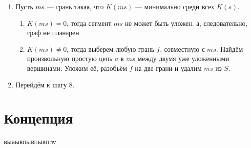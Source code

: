 \documentclass[a4paper, 10pt]{article}
\begin{document}
\begin{enumerate}
    \item Пусть $ms$ — грань такая, что $K(ms)$ — минимально среди всех $K(s)$.
          \begin{enumerate}
          \item $K(ms) = 0$, тогда сегмент $ms$ не может быть уложен, а, следовательно, граф не планарен.
          \item $K(ms) \ne 0$, тогда выберем любую грань $f$, совместную с $ms$. Найдём произвольную простую цепь $a$ в $ms$ между двумя уже уложенными вершинами. Уложим её, разобьём $f$ на две грани и удалим $ms$ из $S$.
          \end{enumerate}
    \item Перейдём к шагу 8.
        
    
\end{enumerate}

\section{Концепция}
выаывпывпывп:w
\end{document}
